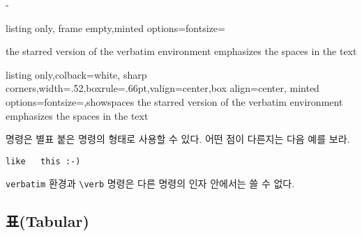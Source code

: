 \noindent 
\noindent\begin{adjustwidth}{0pt}{-\margheadwidth}
\noindent\hspace*{-1.5em}\begin{minipage}[c]{.49\linewidth}%
    \noindent
\begin{tcblisting}{listing only, frame empty,minted options={fontsize=\small\ttfamily}}
\begin{verbatim*}
the starred version of
the      verbatim
environment emphasizes
the spaces   in the text
\end{verbatim*}
\end{tcblisting}
  \end{minipage}\fboxsep=8pt\hspace{.3em}%
\begin{tcblisting}{listing only,colback=white,%
    sharp corners,width=.52\linewidth,boxrule=.66pt,valign=center,box align=center,
    minted options={fontsize=\normalsize\ttfamily,showspaces}}
the starred version of
the      verbatim
environment emphasizes
the spaces   in the text
\end{tcblisting}
\end{adjustwidth}


\medskip

 명령은 별표 붙은 명령의 형태로 사용할 수 있다. 어떤 점이 다른지는 다음 예를 보라.

\begin{example}
\verb*|like   this :-) |
\end{example}

\texttt{verbatim} 환경과 \verb|\verb| 명령은 다른 명령의 인자 안에서는 쓸 수 없다.

\subsection{표(Tabular)}

